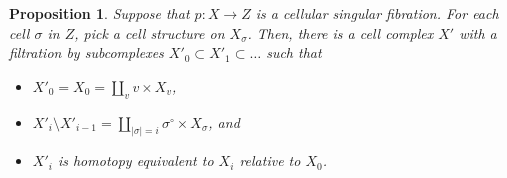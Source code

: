 \documentclass[11pt,letterpaper]{amsart}
\newtheorem{proposition}[theorem]{Proposition}
\begin{document}
\begin{proposition}
\label{cellularprop}
Suppose that $p:X\rightarrow Z$ is a cellular singular fibration. %
For each cell $\sigma$ in $Z$, pick a cell structure on $X_\sigma$. Then, there is a cell complex $X'$ with a filtration by subcomplexes $X'_0\subset X'_1\subset\dots$ such that 
\begin{itemize}
\item 
$X'_0=X_0=\coprod_v v\times X_v$, %
\item 
$X'_i\setminus X'_{i-1}=\coprod_{|\sigma|=i}\sigma^{\circ}\times X_{\sigma}$, and
\item 
$X'_i$ is homotopy equivalent to $X_i$ relative to $X_0$. 
\end{itemize}
\end{proposition}
\end{document}
